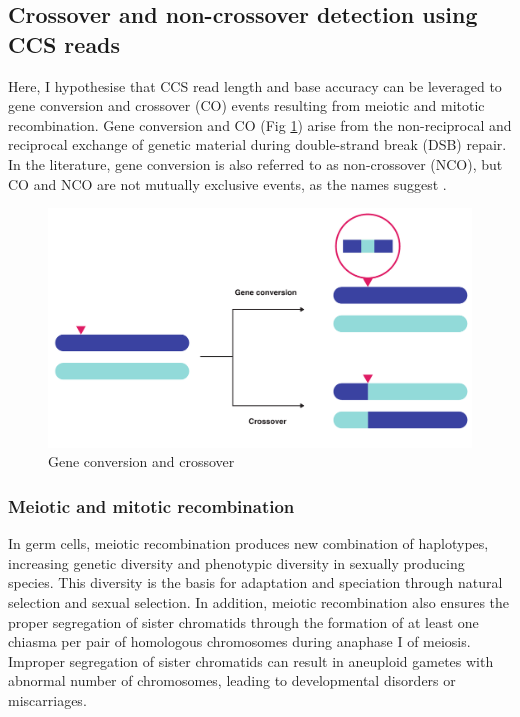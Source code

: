 \subsection{Crossover and non-crossover detection using CCS reads}

Here, I hypothesise that CCS read length and base accuracy can be leveraged to gene conversion and crossover (CO) events resulting from meiotic and mitotic recombination.  Gene conversion and CO (Fig \ref{figure:homologous-recombination}) arise from the non-reciprocal and reciprocal exchange of genetic material during double-strand break (DSB) repair. In the literature, gene conversion is also referred to as non-crossover (NCO), but CO and NCO are not mutually exclusive events, as the names suggest \cite{Hunter2015-gk}. 

\begin{figure}[htbp!]
\caption{Gene conversion and crossover}
\label{figure:homologous-recombination}
\begin{centering}
\includegraphics[width=\textwidth]{meiotic_recombination.pdf}
\end{centering}
\end{figure}

\subsubsection{Meiotic and mitotic recombination}

In germ cells, meiotic recombination produces new combination of haplotypes, increasing genetic diversity and phenotypic diversity in sexually producing species. This diversity is the basis for adaptation and speciation through natural selection and sexual selection. In addition, meiotic recombination also ensures the proper segregation of sister chromatids through the formation of at least one chiasma per pair of homologous chromosomes during anaphase I of meiosis. Improper segregation of sister chromatids can result in aneuploid gametes with abnormal number of chromosomes, leading to developmental disorders or miscarriages. 

